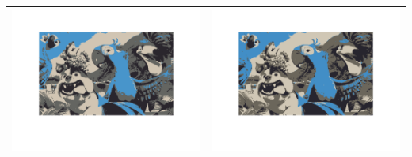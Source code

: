 \documentclass[fleqn]{article}
\begin{document}
\begin{center}
\begin{longtable}{ c | c }
	\includegraphics[scale=0.4]{./pics/task1and2/rio_k=4_random/K=4_iteration_7_random_4_rio.png} & \includegraphics[scale=0.4]{./pics/task1and2/rio_k=4_random/K=4_iteration_8_random_4_rio.png} \\\hline

\end{longtable}
\end{center}
\end{document}
